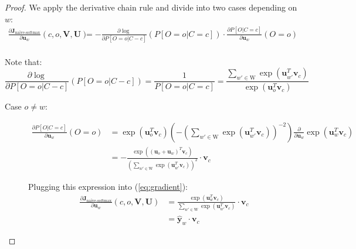 \begin{proof}
  We apply the derivative chain rule and divide into two cases depending on $w$: 
  \begin{equation}\label{eq:gradient}
    \begin{split}
      \frac{\partial \bm{J}_{\text{na\"ive-softmax}}}{\partial \bm{u}_w}(c,o,\bm{V},\bm{U}) & = -\frac{\partial \log{}}{\partial P[O=o | C-c]}(P[O=o | C=c]) \cdot \frac{\partial P[O | C=c]}{\partial \bm{u}_w}(O=o) \\
    \end{split}
  \end{equation}
  
  Note that:
  \begin{equation*}
    \frac{\partial \log}{\partial P[O=o | C-c]}(P[O=o | C-c]) = \frac{1}{P[O=o | C=c]} = \frac{\sum\limits_{w' \in \text{W}} \exp(\bm{u}_{w'}^T \bm{v}_c)}{\exp(\bm{u}_{o}^T \bm{v}_c)} 
  \end{equation*}

  \begin{description}
    \item[Case $o \neq w$:]
      \begin{equation*}
        \begin{split}
          \frac{\partial P[O | C=c]}{\partial \bm{u}_w}(O=o) 
          & =  \exp(\bm{u}_{o}^T \bm{v}_c) \left(-\left(\sum\limits_{w' \in \text{W}} \exp(\bm{u}_{w'}^T \bm{v}_c)\right)^{-2}\right) \frac{\partial}{\partial \bm{u}_w} \exp(\bm{u}_{w}^T \bm{v}_c) \\
          & = -\frac{\exp((\bm{u}_{o} + \bm{u}_{w}) ^T \bm{v}_c)} {\left(\sum\limits_{w' \in \text{W}} \exp(\bm{u}_{w'}^T \bm{v}_c)\right)^2} \cdot \bm{v}_c
        \end{split}
      \end{equation*}

      Plugging this expression into (\ref{eq:gradient}):
      \begin{equation*}
        \begin{split}
          \frac{\partial \bm{J}_{\text{na\"ive-softmax}}}{\partial \bm{u}_w}(c,o,\bm{V},\bm{U}) 
          & = \frac{\exp(\bm{u}_{w}^T \bm{v}_c)} {\sum\limits_{w' \in \text{W}} \exp(\bm{u}_{w'}^T \bm{v}_c)} \cdot \bm{v}_c \\
          & = \hat{\bm{y}}_w \cdot \bm{v}_c
        \end{split}
      \end{equation*}


\end{description}
\end{proof}
